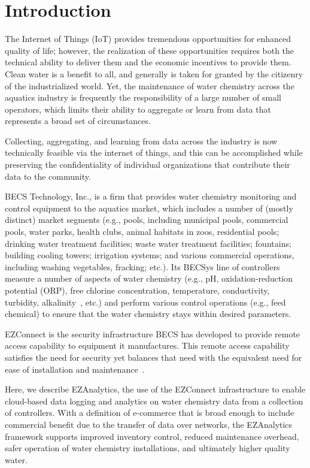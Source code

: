 \section{Introduction}
\label{sec:intro}

The Internet of Things (IoT) provides tremendous opportunities for
enhanced quality of life; however, the realization of these opportunities
requires both the technical ability to deliver them and the economic
incentives to provide them.
Clean water is a benefit to all, and generally is taken for granted
by the citizenry of the industrialized world.
Yet, the maintenance of water chemistry across the aquatics industry
is frequently the responsibility of a large number of small operators,
which limits their ability to aggregate or learn from data that 
represents a broad set of circumstances.

Collecting, aggregating, and learning from data across the industry
is now technically feasible via the internet of things,
and this can be accomplished while
preserving the confidentiality of individual organizations that
contribute their data to the community.

BECS Technology, Inc., is a firm that provides water chemistry monitoring
and control equipment to the aquatics market, which includes a number
of (mostly distinct) market segments (e.g., pools, including municipal pools,
commercial pools, water parks, health clubs, animal habitats in zoos,
residential pools; drinking water treatment facilities; waste water
treatment facilities; fountains; building cooling towers; irrigation
systems; and various commercial operations, including washing vegetables,
fracking; etc.).
Its BECSys\texttrademark{} line of controllers measure
a number of aspects of water chemistry (e.g., pH,
oxidation-reduction potential (ORP), free chlorine concentration,
temperature, conductivity, turbidity, alkalinity~\cite{cew18},
etc.) and perform various control operations (e.g., feed chemical)
to ensure that the water chemistry stays within desired parameters.

EZConnect\texttrademark{}
is the security infrastructure BECS has developed to provide
remote access capability to equipment it manufactures.  This remote
access capability satisfies the need for security yet balances
that need with the equivalent need for ease of installation and
maintenance~\cite{ezconnect,ccgss18}.

Here, we describe EZAnalytics\texttrademark{}, the use of the
EZConnect infrastructure to enable
cloud-based data logging and analytics on water chemistry data from a
collection of controllers.
With a definition of e-commerce that is broad enough to include commercial
benefit due to the transfer of data over networks, 
the EZAnalytics framework supports improved inventory control,
reduced maintenance overhead, safer operation of water chemistry
installations, and ultimately higher quality water.

